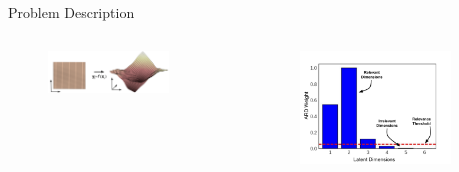 \documentclass[final,hyperref={pdfpagelabels=false}]{beamer}
\begin{document}
\begin{frame}[t]
\begin{columns}[t]
\begin{column}{0.47\linewidth}
\begin{block}{Problem Description}
                \begin{columns}
                    \begin{column}{0.7\textwidth}
                        \begin{figure}
                            \centering
                            \includegraphics[width=0.8\textwidth]{nonlinearMap}
                        \end{figure}
                    \end{column}

                    \begin{column}{0.3\textwidth}
                        \begin{figure}
                            \centering
                            \includegraphics[width=\textwidth]{ard}
                        \end{figure}
                    \end{column}
                \end{columns}
            \end{block}
        \end{column}

        \begin{column}{0.02\linewidth}\end{column}
    \end{columns}


\end{frame}
\end{document}
